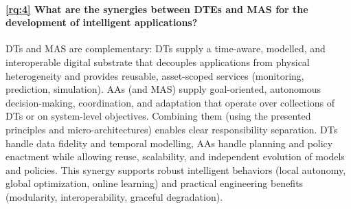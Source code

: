 \paragraph{\ref{rq:4} What are the synergies between \acp{DTE} and \ac{MAS} for the development of intelligent applications?}

DTs and MAS are complementary: DTs supply a time-aware, modelled, and interoperable digital substrate that decouples applications from physical heterogeneity and provides reusable, asset-scoped services (monitoring, prediction, simulation). 
AAs (and MAS) supply goal-oriented, autonomous decision-making, coordination, and adaptation that operate over collections of DTs or on system-level objectives. 
%
Combining them (using the presented principles and micro-architectures) enables clear responsibility separation.
DTs handle data fidelity and temporal modelling, AAs handle planning and policy enactment
while allowing reuse, scalability, and independent evolution of models and policies. 
This synergy supports robust intelligent behaviors (local autonomy, global optimization, online learning) and practical engineering benefits (modularity, interoperability, graceful degradation).


